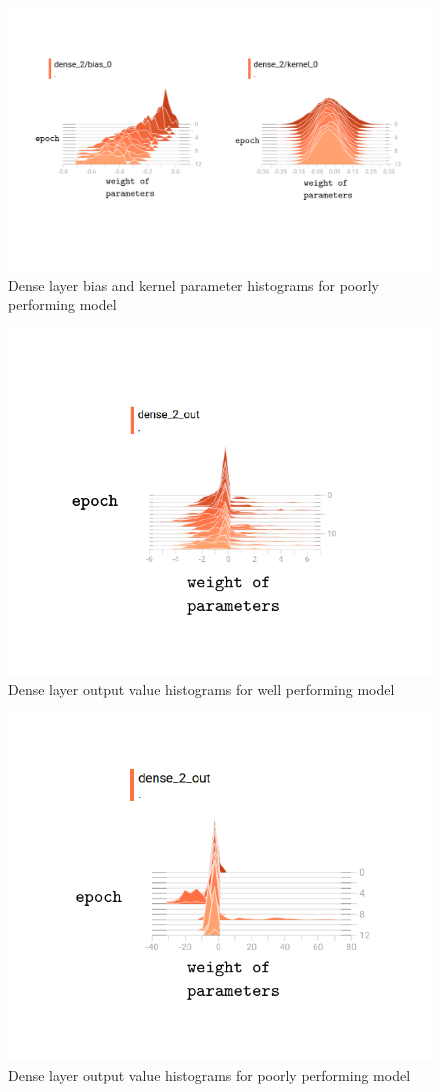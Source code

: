 \documentclass{article}
\begin{document}
\begin{figure}[h]
  \includegraphics[width=\linewidth]{baddense.pdf}
  \caption{Dense layer bias and kernel parameter histograms for poorly performing model}
  \label{fig:baddenseweights}
\end{figure}

\begin{figure}[h]
  \includegraphics[scale=0.8]{gooddenseout.pdf}
  \caption{Dense layer output value histograms for well performing model}
  \label{fig:gooddenseout}
\end{figure}

\begin{figure}[h]
  \includegraphics[scale=0.8]{baddenseout.pdf}
  \caption{Dense layer output value histograms for poorly performing model}
  \label{fig:baddenseout}
\end{figure}
\end{document}
